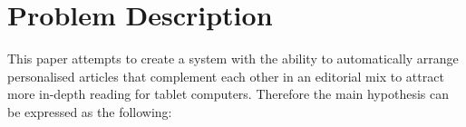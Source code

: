 \section{Problem Description}
This paper attempts to create a system with the ability to automatically arrange personalised articles that complement each other in an editorial mix to attract more in-depth reading for tablet computers. Therefore the main hypothesis can be expressed as the following:

